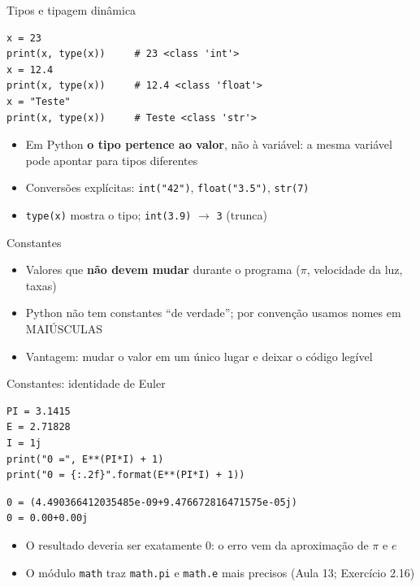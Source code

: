 \documentclass[aspectratio=169,10pt,t]{beamer}
\begin{document}
\begin{frame}[fragile]{Tipos e tipagem dinâmica}
\begin{lstlisting}
x = 23
print(x, type(x))     # 23 <class 'int'>
x = 12.4
print(x, type(x))     # 12.4 <class 'float'>
x = "Teste"
print(x, type(x))     # Teste <class 'str'>
\end{lstlisting}
  \begin{itemize}
    \item Em Python \textbf{o tipo pertence ao valor}, não à variável: a mesma variável pode apontar para tipos diferentes
    \item Conversões explícitas: \texttt{int("42")}, \texttt{float("3.5")}, \texttt{str(7)}
    \item \texttt{type(x)} mostra o tipo; \texttt{int(3.9)} \(\to\) \texttt{3} (trunca)
  \end{itemize}
\end{frame}

\begin{frame}{Constantes}
  \begin{itemize}
    \item Valores que \textbf{não devem mudar} durante o programa (\(\pi\), velocidade da luz, taxas)
    \item Python não tem constantes ``de verdade''; por \alert{convenção} usamos nomes em MAIÚSCULAS
    \item Vantagem: mudar o valor em um único lugar e deixar o código legível
  \end{itemize}
\end{frame}

\begin{frame}[fragile]{Constantes: identidade de Euler}
\begin{lstlisting}
PI = 3.1415
E = 2.71828
I = 1j
print("0 =", E**(PI*I) + 1)
print("0 = {:.2f}".format(E**(PI*I) + 1))
\end{lstlisting}
\begin{lstlisting}[style=saida]
0 = (4.490366412035485e-09+9.476672816471575e-05j)
0 = 0.00+0.00j
\end{lstlisting}
  \begin{itemize}
    \item O resultado deveria ser exatamente 0: o erro vem da aproximação de \(\pi\) e \(e\)
    \item O módulo \texttt{math} traz \texttt{math.pi} e \texttt{math.e} mais precisos (Aula 13; Exercício 2.16)
  \end{itemize}
\end{frame}
\end{document}
